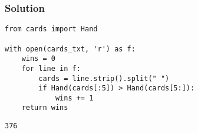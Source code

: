 \documentclass[11pt]{article}
\begin{document}
\subsubsection{Solution}
\label{sec:orgheadline16}
\begin{verbatim}
from cards import Hand

with open(cards_txt, 'r') as f:
    wins = 0
    for line in f:
        cards = line.strip().split(" ")
        if Hand(cards[:5]) > Hand(cards[5:]):
            wins += 1
    return wins
\end{verbatim}

\begin{verbatim}
376
\end{verbatim}
\end{document}
